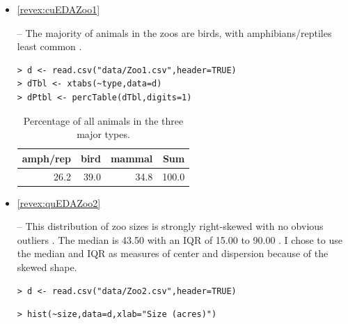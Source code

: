 \documentclass[10pt,openany]{book}\usepackage[]{graphicx}\usepackage[]{color}
\makeatletter
\newenvironment{kframe}{%
 \def\at@end@of@kframe{}%
 \ifinner\ifhmode%
  \def\at@end@of@kframe{\end{minipage}}%
  \begin{minipage}{\columnwidth}%
 \fi\fi%
 \def\FrameCommand##1{\hskip\@totalleftmargin \hskip-\fboxsep
 \colorbox{shadecolor}{##1}\hskip-\fboxsep
     \hskip-\linewidth \hskip-\@totalleftmargin \hskip\columnwidth}%
 \MakeFramed {\advance\hsize-\width
   \@totalleftmargin\z@ \linewidth\hsize
   \@setminipage}}%
 {\par\unskip\endMakeFramed%
 \at@end@of@kframe}
\newenvironment{knitrout}{}{} %
\makeatother
\begin{document}
\begin{itemize}
  \item \hypertarget{ans:cuEDAZoo1}{\ref{revex:cuEDAZoo1}} -- The majority of animals in the zoos are birds, with amphibians/reptiles least common .
\begin{knitrout}
\color{fgcolor}\begin{kframe}
\begin{verbatim}
> d <- read.csv("data/Zoo1.csv",header=TRUE)
> dTbl <- xtabs(~type,data=d)
> dPtbl <- percTable(dTbl,digits=1)
\end{verbatim}
\end{kframe}
\end{knitrout}
\begin{table}[ht]
\centering
\caption{Percentage of all animals in the three major types.} 
\label{tab:Zoo1}
\begin{tabular}{rrrr}
  \hline
amph/rep & bird & mammal & Sum \\ 
  \hline
26.2 & 39.0 & 34.8 & 100.0 \\ 
   \hline
\end{tabular}
\end{table}



  \item \hypertarget{ans:quEDAZoo2}{\ref{revex:quEDAZoo2}} -- This distribution of zoo sizes is strongly right-skewed with no obvious outliers .  The median is 43.50 with an IQR of 15.00 to 90.00 .  I chose to use the median and IQR as measures of center and dispersion because of the skewed shape.
\begin{knitrout}
\color{fgcolor}\begin{kframe}
\begin{verbatim}
> d <- read.csv("data/Zoo2.csv",header=TRUE)
\end{verbatim}
\end{kframe}
\end{knitrout}
\begin{knitrout}
\color{fgcolor}\begin{kframe}
\begin{verbatim}
> hist(~size,data=d,xlab="Size (acres)")
\end{verbatim}
\end{kframe}\begin{figure}[hbtp]


\end{figure}
\end{knitrout}
\end{itemize}
\end{document}
